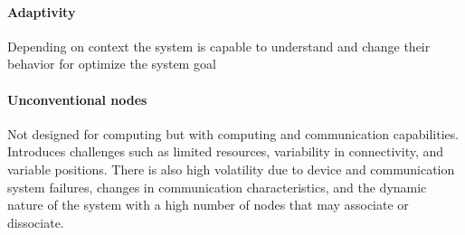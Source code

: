 \paragraph{Adaptivity}
Depending on context the system is capable to understand and change their behavior for optimize the system goal

\paragraph{Unconventional nodes}
Not designed for computing but with computing and communication capabilities. Introduces challenges such as limited resources, variability in connectivity, and variable positions. There is also high volatility due to device and communication system failures, changes in communication characteristics, and the dynamic nature of the system with a high number of nodes that may associate or dissociate.

\newpage